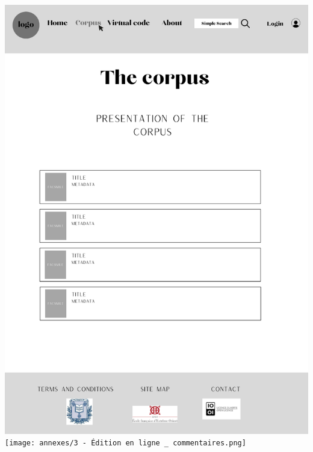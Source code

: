 \noindent \includegraphics[width=\textwidth]{annexes/2-Corpus.png}
\noindent \texttt{[image: annexes/3 - Édition en ligne \_ commentaires.png]}
